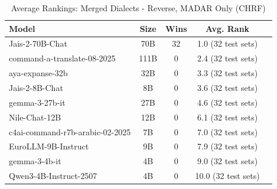 \begin{table}[htbp]
\centering
\caption{Average Rankings: Merged Dialects - Reverse, MADAR Only (CHRF)}
\label{tab:avg_rankings_chrf}
\begin{tabular}{l@{\hspace{3pt}}c@{\hspace{3pt}}c@{\hspace{3pt}}c@{\hspace{3pt}}c}
\toprule
Model & Size & Wins & Avg. Rank \\
\midrule
Jais-2-70B-Chat & 70B & 32 & 1.0 (32 test sets) \\
command-a-translate-08-2025 & 111B & 0 & 2.4 (32 test sets) \\
aya-expanse-32b & 32B & 0 & 3.3 (32 test sets) \\
Jais-2-8B-Chat & 8B & 0 & 3.6 (32 test sets) \\
gemma-3-27b-it & 27B & 0 & 4.6 (32 test sets) \\
Nile-Chat-12B & 12B & 0 & 6.1 (32 test sets) \\
c4ai-command-r7b-arabic-02-2025 & 7B & 0 & 7.0 (32 test sets) \\
EuroLLM-9B-Instruct & 9B & 0 & 7.9 (32 test sets) \\
gemma-3-4b-it & 4B & 0 & 9.0 (32 test sets) \\
Qwen3-4B-Instruct-2507 & 4B & 0 & 10.0 (32 test sets) \\
\bottomrule
\end{tabular}
\end{table}